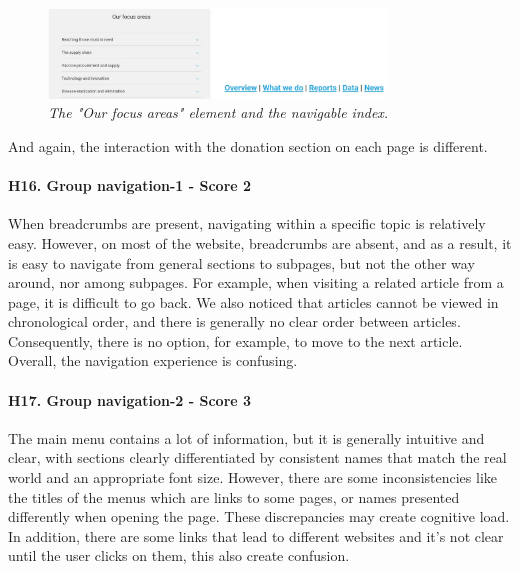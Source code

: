\begin{figure}[!h]
	\begin{center}
		\includegraphics[width=0.8\textwidth]{FinalScores19.jpg}
		\captionsetup{font=small}
		\caption{\textit{The "Our focus areas" element and the navigable index.}}
	\end{center}
\end{figure}
\newline And again, the interaction with the donation section on each page is different.
\newline
\newline \paragraph{H16. Group navigation-1 - Score 2}  \label{subsec:H16}	When breadcrumbs are present, navigating within a specific topic is relatively easy. However, on most of the website, breadcrumbs are absent, and as a result, it is easy to navigate from general sections to subpages, but not the other way around, nor among subpages. For example, when visiting a related article from a page, it is difficult to go back.
\newline We also noticed that articles cannot be viewed in chronological order, and there is generally no clear order between articles. Consequently, there is no option, for example, to move to the next article.
\newline Overall, the navigation experience is confusing.
\newline
\newline \paragraph{H17. Group navigation-2 - Score 3}  \label{subsec:H17}	The main menu contains a lot of information, but it is generally intuitive and clear, with sections clearly differentiated by consistent names that match the real world and an appropriate font size. However, there are some inconsistencies like the titles of the menus which are links to some pages, or names presented differently when opening the page. These discrepancies may create cognitive load. 
\newline In addition, there are some links that lead to different websites and it’s not clear until the user clicks on them, this also create confusion.
